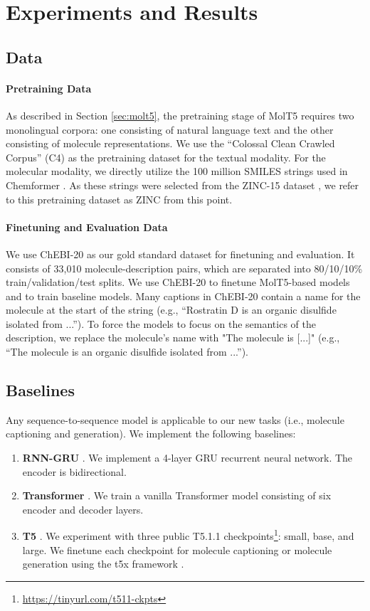 
\section{Experiments and Results}

\subsection{Data}


\paragraph{Pretraining Data} As described in Section \ref{sec:molt5}, the pretraining stage of MolT5 requires two monolingual corpora: one consisting of natural language text and the other consisting of molecule representations. We use the ``Colossal Clean Crawled Corpus'' (C4) \cite{raffel2020exploring} as the pretraining dataset for the textual modality. For the molecular modality, we directly utilize the 100 million SMILES strings used in Chemformer \cite{irwindimitriadishebjerrum2021}. As these strings were selected from the ZINC-15 dataset \cite{sterling2015zinc}, we refer to this pretraining dataset as ZINC from this point.

\paragraph{Finetuning and Evaluation Data} We use ChEBI-20 \cite{edwards2021text2mol} as our gold standard dataset for finetuning and evaluation. It consists of 33,010 molecule-description pairs, which are separated into 80/10/10\% train/validation/test splits.
We use ChEBI-20 to finetune MolT5-based models and to train baseline models. Many captions in ChEBI-20 contain a name for the molecule at the start of the string (e.g., ``Rostratin D is an organic disulfide isolated from ...''). To force the models to focus on the semantics of the description, we replace the molecule's name with "The molecule is [...]" (e.g., ``The molecule is an organic disulfide isolated from ...''). 

\subsection{Baselines}\label{sec:baselines}
Any sequence-to-sequence model is applicable to our new tasks (i.e., molecule captioning and generation). We implement the following baselines:
\begin{enumerate}
    \item \textbf{RNN-GRU} \cite{cho2014learning}. We implement a 4-layer GRU recurrent neural network. The encoder is bidirectional.
    \item \textbf{Transformer} \cite{vaswani2017attention}. We train a vanilla Transformer model consisting of six encoder and decoder layers. \item \textbf{T5} \cite{raffel2020exploring}. We experiment with three public T5.1.1 checkpoints\footnote{\url{https://tinyurl.com/t511-ckpts}}: small, base, and large. We finetune each checkpoint for molecule captioning or molecule generation using the t5x framework \cite{roberts2022t5x}.\end{enumerate}

